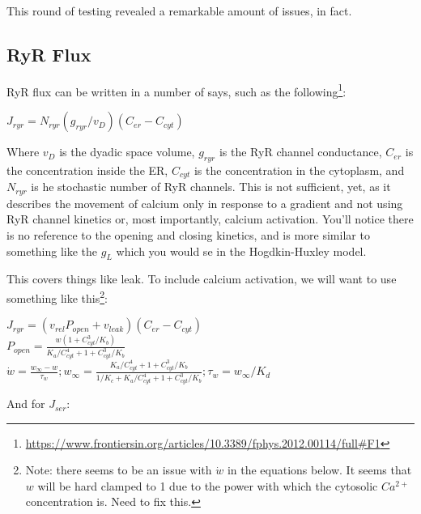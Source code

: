 \documentclass[12pt]{amsart}
\begin{document}
This round of testing revealed a remarkable amount of issues, in fact.


\subsection{RyR Flux} RyR flux can be written in a number of says, such as the following\footnote{\url{https://www.frontiersin.org/articles/10.3389/fphys.2012.00114/full\#F1}}: 

\bigskip

\begin{center}

    $J_{ryr} = N_{ryr}(g_{ryr}/v_D)(C_{er} - C_{cyt})$
    
\end{center}

\bigskip

Where $v_D$ is the dyadic space volume, $g_{ryr}$ is the RyR channel conductance, $C_{er}$ is the concentration inside the ER, $C_{cyt}$ is the concentration in the cytoplasm, and $N_{ryr}$ is he stochastic number of RyR channels. This is not sufficient, yet, as it describes the movement of calcium only in response to a gradient and not using RyR channel kinetics or, most importantly, calcium activation. You'll notice there is no reference to the opening and closing kinetics, and is more similar to something like the $g_L$ which you would se in the Hogdkin-Huxley model.\newline

This covers things like leak. To include calcium activation, we will want to use something like this\footnote{Note: there seems to be an issue with $\dot{w}$ in the equations below. It seems that $w$ will be hard clamped to 1 due to the power with which the cytosolic $Ca^{2+}$ concentration is. Need to fix this.}: 

\bigskip
\begin{center}

    $J_{ryr} = (v_{rel}P_{open} + v_{leak})(C_{er} - C_{cyt})$\\
    \smallskip
    $P_{open} = \frac{w(1 + C^3_{cyt} / K_b)}{K_a / C^4_{cyt} + 1 + C_{cyt}^3/ K_b}$\\
    \smallskip
    $\dot{w} = \frac{w_{\infty} - w}{\tau_w}; w_{\infty} = \frac{K_a / C^4_{cyt} + 1 + C_{cyt}^3/ K_b}{1/K_c + K_a / C^4_{cyt} + 1 + C_{cyt}^3/ K_b}; \tau_w = w_{\infty}/K_d$
    
\end{center}

And for $J_{ser}$:
\end{document}

